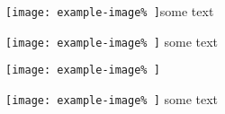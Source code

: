 \texttt{[image: example-image\%
]}some text

\texttt{[image: example-image\%
]} some text

\texttt{[image: example-image\%
]} %

\texttt{[image: example-image\%
]}  some text
